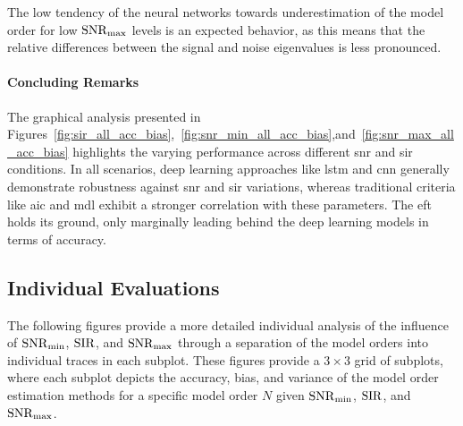 The low tendency of the neural networks towards underestimation of the model order for low \( \mathrm{SNR}_{\max} \) levels is an expected
behavior, as this means that the relative differences between the signal and noise eigenvalues is less pronounced.


\paragraph{Concluding Remarks}
The graphical analysis presented in Figures~\ref{fig:sir_all_acc_bias},~\ref{fig:snr_min_all_acc_bias},and~\ref{fig:snr_max_all_acc_bias}
highlights the varying performance across different \gls{snr} and \gls{sir} conditions.
In all scenarios, deep learning approaches like \gls{lstm} and \gls{cnn} generally demonstrate robustness against \gls{snr}
and \gls{sir} variations, whereas traditional criteria like \gls{aic} and \gls{mdl} exhibit a stronger correlation with these parameters.
The \gls{eft} holds its ground, only marginally leading behind the deep learning models in terms of accuracy.

\subsection{Individual Evaluations}

The following figures provide a more detailed individual analysis of the influence of \( \mathrm{SNR}_{\min} \), \( \mathrm{SIR} \), and \( \mathrm{SNR}_{\max} \) through
a separation of the model orders into individual traces in each subplot.
These figures provide a \( 3 \times 3 \) grid of subplots, where each subplot depicts the accuracy, bias, and variance
of the model order estimation methods for a specific model order \( N \) given \( \mathrm{SNR}_{\min} \), \( \mathrm{SIR} \), and \( \mathrm{SNR}_{\max} \).

